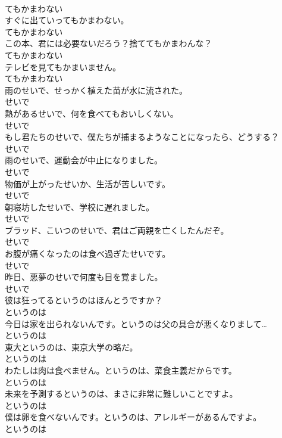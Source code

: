\documentclass[8pt]{extreport}
\begin{document}
\begin{CJK}{UTF8}{min}
\\	てもかまわない
\\	すぐに出ていってもかまわない。	
\\	てもかまわない
\\	この本、君には必要ないだろう？捨ててもかまわんな？	
\\	てもかまわない
\\	テレビを見てもかまいません。	
\\	てもかまわない
\\	雨のせいで、せっかく植えた苗が水に流された。	
\\	せいで
\\	熱があるせいで、何を食べてもおいしくない。	
\\	せいで
\\	もし君たちのせいで、僕たちが捕まるようなことになったら、どうする？	
\\	せいで
\\	雨のせいで、運動会が中止になりました。	
\\	せいで
\\	物価が上がったせいか、生活が苦しいです。	
\\	せいで
\\	朝寝坊したせいで、学校に遅れました。	
\\	せいで
\\	ブラッド、こいつのせいで、君はご両親を亡くしたんだぞ。	
\\	せいで
\\	お腹が痛くなったのは食べ過ぎたせいです。	
\\	せいで
\\	昨日、悪夢のせいで何度も目を覚ました。	
\\	せいで
\\	彼は狂ってるというのはほんとうですか？	
\\	というのは
\\	今日は家を出られないんです。というのは父の具合が悪くなりまして…	
\\	というのは
\\	東大というのは、東京大学の略だ。	
\\	というのは
\\	わたしは肉は食べません。というのは、菜食主義だからです。	
\\	というのは
\\	未来を予測するというのは、まさに非常に難しいことですよ。	
\\	というのは
\\	僕は卵を食べないんです。というのは、アレルギーがあるんですよ。	
\\	というのは

\end{CJK}
\end{document}
